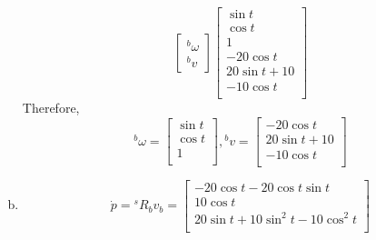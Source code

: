 \begin{enumerate}[(a)]
\[\begin{bmatrix}
        {}^b\omega \\ {}^bv
    \end{bmatrix}
    \begin{bmatrix}
        \sin t \\ \cos t \\ 1 \\ -20\cos t \\ 20\sin t + 10 \\ -10\cos t \\
    \end{bmatrix}\]
    Therefore, \[{}^b\omega = \begin{bmatrix}
        \sin t \\ \cos t \\ 1 \\
    \end{bmatrix},
    {}^bv = \begin{bmatrix}
    -20\cos t \\ 20\sin t + 10 \\ -10\cos t \\
    \end{bmatrix}
    \]
    \item 
    \[\dot{p} = {}^sR_bv_b = \begin{bmatrix}
        -20 \cos t - 20 \cos t \sin t \\ 10 \cos t \\ 20 \sin t + 10 \sin^2t- 10 \cos^2t \\
    \end{bmatrix}\]
\end{enumerate}